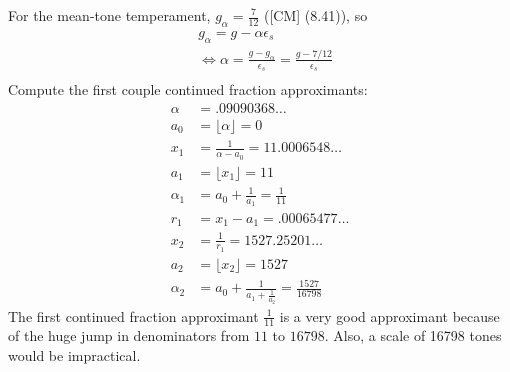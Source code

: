 \documentclass[12pt, reqno]{amsart}
\theoremstyle{definition}
\theoremstyle{remark}
\begin{document}
\begin{itemize}
\begin{itemize}


For the mean-tone temperament, $g_{\alpha}= \frac{7}{12}$ ([CM] (8.41)), so 
\begin{align*}
&g_{\alpha}= g-\alpha \epsilon_{s}\\
&\iff \alpha= \frac{g-g_{\alpha}}{\epsilon_{s}}= \frac{g-7/12}{\epsilon_{s}}\\
\end{align*}
Compute the first couple continued fraction approximants:
\begin{align*}
\alpha&= .09090368\ldots\\
a_{0}&= \lfloor \alpha\rfloor= 0\\
x_{1}&= \frac{1}{\alpha-a_{0}}=11.0006548\ldots\\
a_{1}&= \lfloor x_{1}\rfloor=11\\
\alpha_{1}&= a_{0}+ \frac{1}{a_{1}}= \frac{1}{11}\\
r_{1}&= x_{1}-a_{1}=.00065477\ldots\\
x_{2}&= \frac{1}{r_{1}}=1527.25201\ldots\\
a_{2}&= \lfloor x_{2}\rfloor =1527\\
\alpha_{2}&= a_{0}+ \frac{1}{a_{1}+\frac{1}{a_{2}}}= \frac{1527}{16798} 
\end{align*}
The first continued fraction approximant $\frac{1}{11}$ is a very good approximant because of the huge jump in denominators from $11$ to $16798$. Also, a scale of 16798 tones would be impractical.

\end{itemize}



\end{itemize}
\end{document}

